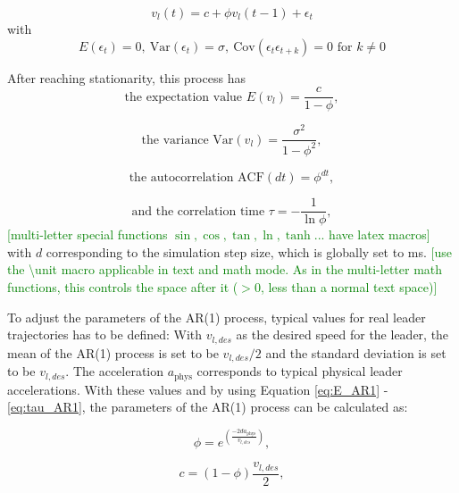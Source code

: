 \documentclass[review]{elsarticle}
\providecommand{\green}[1]{\textcolor{green}{#1}}
\providecommand{\martinc}[1]{\green{[#1]}} %
\providecommand{\sub}[1]{_{\mathrm{#1}}}  %
\providecommand{\3}{{\ss}}
\begin{document}
\begin{equation} \label{eq:AR1}
	v_l(t) = c+\phi v_l(t-1)+ \epsilon_t
\end{equation}
with
\begin{equation}
    E(\epsilon_t) = 0, \ \text{Var}(\epsilon_t) = \sigma, \ 
\text{Cov}(\epsilon_t\epsilon_{t+k})=0 \text{ for }k\neq 0
\end{equation}

After reaching stationarity, this process has 
\begin{equation}
\label{eq:E_AR1}
 \text{the expectation value }E(v_l) = \frac{c}{1-\phi}, 
 \end{equation}
 
 \begin{equation}
 \label{eq:V_AR1}
 \text{the variance }\text{Var}(v_l) = \frac{\sigma^2}{1-\phi^2}, 
 \end{equation}

 \begin{equation}
 \label{eq:ACF_AR1}
\text{the autocorrelation  }\text{ACF}(dt) = \phi^{dt}, 
\end{equation}

 \begin{equation}
 \label{eq:tau_AR1}
\text{and the correlation time  }\tau = -\frac{1}{\ln \phi}, 
\end{equation}
\martinc{multi-letter special functions $\sin, \cos, \tan, \ln, \tanh
  ...$ have latex macros}
with $d$ corresponding to the simulation step size, which is globally
set to \unit[100]{ms}. \martinc{use the \textbackslash unit macro applicable
  in text and math mode. As in the multi-letter math functions, this
  controls the space after it ($>0$, less than a normal text space)} 

To adjust the parameters of the AR(1) process, typical values for real leader trajectories has to be defined: With $v_{l,des}$ as the desired speed for the leader, the mean of the AR(1) process is set to be $v_{l,des}/2$ and the standard deviation is set to be $v_{l,des}$. The acceleration $a\sub{phys}$ corresponds to typical physical leader accelerations. With these values and by using Equation \eqref{eq:E_AR1} - \eqref{eq:tau_AR1}, the parameters of the AR(1) process can be calculated as:

 \begin{equation}
\phi = e^{(\frac{-2da\sub{phys}}{v_{l,des}})},
\end{equation}

 \begin{equation}
c=(1-\phi)\frac{v_{l,des}}{2},
\end{equation}
\end{document}
